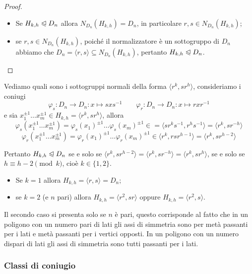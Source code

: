 \documentclass[11pt]{scrartcl}
\begin{document}
\begin{proof}~
    \begin{itemize}
        \item Se $H_{k, h}\trianglelefteqslant D_n$ allora $N_{D_n}(H_{k, h}) = D_n$, 
        in particolare $r, s \in N_{D_n}(H_{k, h})$;
        \item se $r, s \in N_{D_n}(H_{k, h})$, poiché il normalizzatore è un
        sottogruppo di $D_n$ abbiamo che $D_n = \langle r, s\rangle \subseteq
        N_{D_n}(H_{k, h})$, pertanto $H_{k, h} \trianglelefteqslant D_n$.
    \end{itemize}
\end{proof}

Vediamo quali sono i sottogruppi normali della forma 
$\langle r^k, sr^h\rangle$, consideriamo i coniugi \[
    \varphi_s: D_n \longrightarrow D_n :x \longmapsto sxs^{-1}\qquad
    \varphi_r: D_n \longrightarrow D_n :x \longmapsto rxr^{-1}
\]e sia $x_1^{\pm 1}\ldots x_m^{\pm 1} \in H_{k, h} = \langle r^k, sr^h\rangle$, allora
\[
    \varphi_s(x_1^{\pm 1}\ldots x_m^{\pm 1}) = \varphi_s(x_1)^{\pm 1}\ldots \varphi_s(x_m)^{\pm 1}
    \in = \langle sr^ks^{-1}, r^hs^{-1}\rangle = \langle r^k, sr^{-h}\rangle
\]
\[
    \varphi_r(x_1^{\pm 1}\ldots x_m^{\pm 1}) = \varphi_r(x_1)^{\pm 1}\ldots \varphi_r(x_m)^{\pm 1}
    \in \langle r^k, rsr^{h - 1}\rangle = \langle r^k, sr^{h - 2}\rangle
\]

Pertanto $H_{k, h}\trianglelefteqslant D_n$ se e solo se $\langle r^k, sr^{h - 2}\rangle
= \langle r^k, sr^{-h}\rangle = \langle r^k, sr^h\rangle$, se e solo se 
$h \equiv h - 2 \pmod k$, cioè $k \in \{1, 2\}$.\begin{itemize}
    \item Se $k = 1$ allora $H_{k, h} = \langle r, s\rangle = D_n$;
    \item se $k = 2$ (e $n$ pari) allora $H_{k, h} = \langle r^2, sr\rangle$ oppure 
    $H_{k, h} = \langle r^2, s\rangle$.
\end{itemize}

\begin{remark}
    Il secondo caso si presenta solo se $n$ è pari, questo corrisponde al fatto 
    che in un poligono con un numero pari di lati gli assi di simmetria sono 
    per metà passanti per i lati e metà passanti per i vertici opposti. In un poligono con un numero dispari
    di lati gli assi di simmetria sono tutti passanti per i lati.
\end{remark}


\subsubsection{Classi di coniugio}
\end{document}
